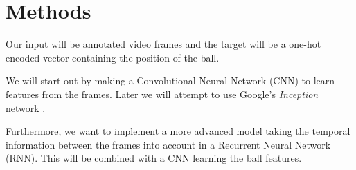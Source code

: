 
\section{Methods}
Our input will be annotated video frames and the target will be a one-hot encoded vector containing the position of the ball.

We will start out by making a Convolutional Neural Network (CNN) to learn features from the frames.
Later we will attempt to use Google's \textit{Inception} network \cite{inception}.

Furthermore, we want to implement a more advanced model taking the temporal information between the frames into account in a Recurrent Neural Network (RNN). This will be combined with a CNN learning the ball features.
